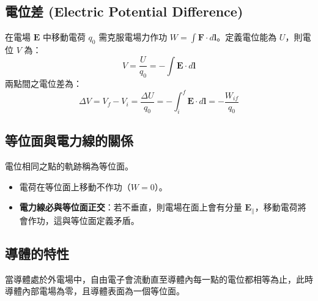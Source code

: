 \subsection{電位差 (Electric Potential Difference)}
在電場 $\mathbf{E}$ 中移動電荷 $q_0$ 需克服電場力作功 $W = \int \mathbf{F} \cdot d\mathbf{l}$。定義電位能為 $U$，則電位 $V$ 為：
\begin{equation}
    V = \frac{U}{q_0} = -\int \mathbf{E} \cdot d\mathbf{l}
\end{equation}
兩點間之電位差為：
\begin{equation}
    \Delta V = V_f - V_i = \frac{\Delta U}{q_0} = -\int_i^f \mathbf{E} \cdot d\mathbf{l} = -\frac{W_{if}}{q_0}
\end{equation}

\subsection{等位面與電力線的關係}
電位相同之點的軌跡稱為等位面。
\begin{itemize}
    \item 電荷在等位面上移動不作功（$W=0$）。
    \item \textbf{電力線必與等位面正交}：若不垂直，則電場在面上會有分量 $\mathbf{E}_{\parallel}$，移動電荷將會作功，這與等位面定義矛盾。
\end{itemize}



\subsection{導體的特性}
當導體處於外電場中，自由電子會流動直至導體內每一點的電位都相等為止，此時導體內部電場為零，且導體表面為一個等位面。